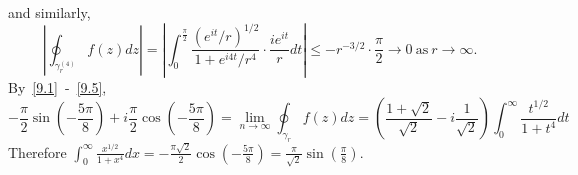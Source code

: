 \documentclass[12pt]{article}
\begin{document}
and similarly,
\begin{equation}
\left|\oint_{\gamma_{r}^{(4)}}f(z)dz\right| = \left|\int_{0}^{\frac{\pi}{2}}\frac{(e^{it}/r)^{1/2}}{1 + e^{i4t}/r^{4}}\cdot \frac{ie^{it}}{r}dt\right|
\leq -r^{-3/2} \cdot \frac{\pi}{2} \rightarrow 0 \ \text{as}\  r\rightarrow \infty.
\label{9.5}
\end{equation}
By~\eqref{9.1}~-~\eqref{9.5},
\[ -\frac{\pi}{2}\sin\left( -\frac{5\pi}{8} \right) + i\frac{\pi}{2}\cos\left( -\frac{5\pi}{8} \right) =
\lim_{n\rightarrow \infty}\oint_{\gamma_{r}}f(z)dz =
\left(\frac{1 + \sqrt{2}}{\sqrt{2}} -i\frac{1}{\sqrt{2}}\right)\int_{0}^{\infty}\frac{t^{1/2}}{1 + t^{4}}dt \]
Therefore $\int_{0}^{\infty}\frac{x^{1/2}}{1 + x^{4}}dx = - \frac{\pi\sqrt{2}}{2} \cos \left( -\frac{5\pi}{8} \right) = \frac{\pi}{\sqrt{2}} \sin\left( \frac{\pi}{8} \right)$.



\newpage
\end{document}

